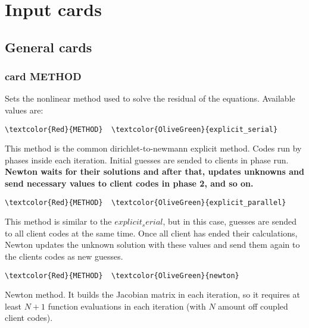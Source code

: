 \chapter{Input cards}




\section{General cards}

\subsection{card METHOD}

Sets the nonlinear method used to solve the residual of the equations. Available values are: 

\begin{Verbatim}[frame=single,commandchars=\\\{\}]
\textcolor{Red}{METHOD}  \textcolor{OliveGreen}{explicit_serial} 
\end{Verbatim}
This method is the common dirichlet-to-newmann explicit method. Codes run by phases inside each iteration. Initial guesses are sended to clients in phase run. \bf{Newton} waits for their solutions and after that, updates unknowns and send necessary values to client codes in phase 2, and so on.

\begin{Verbatim}[frame=single,commandchars=\\\{\}]
\textcolor{Red}{METHOD}  \textcolor{OliveGreen}{explicit_parallel} 
\end{Verbatim}
This method is similar to the $explicit_serial$, but in this case, guesses are sended to all client codes at the same time. Once all client has ended their calculations, Newton updates the unknown solution with these values and send them again to the clients codes as new guesses.

\begin{Verbatim}[frame=single,commandchars=\\\{\}]
\textcolor{Red}{METHOD}  \textcolor{OliveGreen}{newton} 
\end{Verbatim}
Newton method. It builds the Jacobian matrix in each iteration, so it requires at least $N+1$ function evaluations in each iteration (with $N$ amount off coupled client codes).

